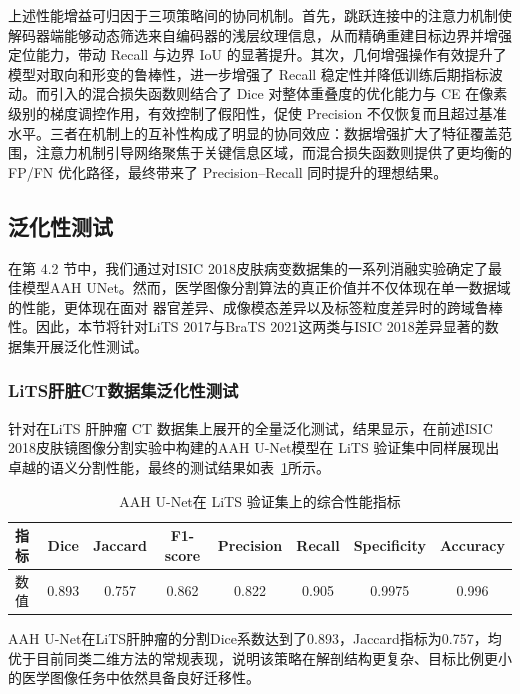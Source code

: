 上述性能增益可归因于三项策略间的协同机制。首先，跳跃连接中的注意力机制使解码器端能够动态筛选来自编码器的浅层纹理信息，从而精确重建目标边界并增强定位能力，带动 Recall 与边界 IoU 的显著提升。其次，几何增强操作有效提升了模型对取向和形变的鲁棒性，进一步增强了 Recall 稳定性并降低训练后期指标波动。而引入的混合损失函数则结合了 Dice 对整体重叠度的优化能力与 CE 在像素级别的梯度调控作用，有效控制了假阳性，促使 Precision 不仅恢复而且超过基准水平。三者在机制上的互补性构成了明显的协同效应：数据增强扩大了特征覆盖范围，注意力机制引导网络聚焦于关键信息区域，而混合损失函数则提供了更均衡的 FP/FN 优化路径，最终带来了 Precision–Recall 同时提升的理想结果。

\subsection{泛化性测试}

在第 4.2 节中，我们通过对ISIC 2018皮肤病变数据集的一系列消融实验确定了最佳模型AAH UNet。然而，医学图像分割算法的真正价值并不仅体现在单一数据域的性能，更体现在面对 器官差异、成像模态差异以及标签粒度差异时的跨域鲁棒性。因此，本节将针对LiTS 2017与BraTS 2021这两类与ISIC 2018差异显著的数据集开展泛化性测试。

\subsubsection{LiTS肝脏CT数据集泛化性测试}

针对在LiTS 肝肿瘤 CT 数据集上展开的全量泛化测试，结果显示，在前述ISIC 2018皮肤镜图像分割实验中构建的AAH U-Net模型在 LiTS 验证集中同样展现出卓越的语义分割性能，最终的测试结果如表~\ref{tab:lits_final_metrics}所示。

\begin{table}[!htbp]
    \centering
    \caption{AAH U-Net在 LiTS 验证集上的综合性能指标}
    \label{tab:lits_final_metrics}
    \begin{tabular}{lccccccc}
        \toprule
        指标 & Dice & Jaccard & F1-score & Precision & Recall & Specificity & Accuracy \\
        \midrule
        数值 & 0.893 & 0.757 & 0.862 & 0.822 & 0.905 & 0.9975 & 0.996\\
        \bottomrule
    \end{tabular}
\end{table}

AAH U-Net在LiTS肝肿瘤的分割Dice系数达到了0.893，Jaccard指标为0.757，均优于目前同类二维方法的常规表现，说明该策略在解剖结构更复杂、目标比例更小的医学图像任务中依然具备良好迁移性。

